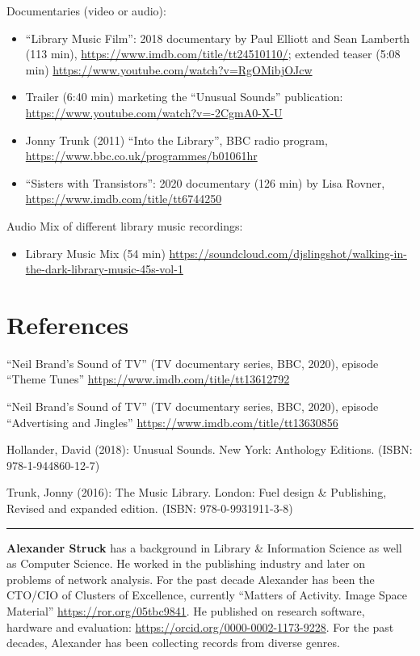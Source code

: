 \documentclass[a4paper,
fontsize=11pt,
oneside,
numbers=noperiodatend,
parskip=half-,
bibliography=totoc,
final
]{scrartcl}
\begin{document}
Documentaries (video or audio):

\begin{itemize}
\item
  \enquote{Library Music Film}: 2018 documentary by Paul Elliott and
  Sean Lamberth (113 min), \url{https://www.imdb.com/title/tt24510110/};
  extended teaser (5:08 min)
  \url{https://www.youtube.com/watch?v=RgOMibjOJcw}
\item
  Trailer (6:40 min) marketing the \enquote{Unusual Sounds} publication:
  \url{https://www.youtube.com/watch?v=-2CgmA0-X-U}
\item
  Jonny Trunk (2011) \enquote{Into the Library}, BBC radio program,
  \url{https://www.bbc.co.uk/programmes/b01061hr}
\item
  \enquote{Sisters with Transistors}: 2020 documentary (126 min) by Lisa
  Rovner, \url{https://www.imdb.com/title/tt6744250}
\end{itemize}

Audio Mix of different library music recordings:

\begin{itemize}
\item
  Library Music Mix (54 min)
  \url{https://soundcloud.com/djslingshot/walking-in-the-dark-library-music-45s-vol-1}
\end{itemize}

\hypertarget{references}{%
\section{References}\label{references}}

\enquote{Neil Brand's Sound of TV} (TV documentary series, BBC, 2020),
episode \enquote{Theme Tunes}
\url{https://www.imdb.com/title/tt13612792}

\enquote{Neil Brand's Sound of TV} (TV documentary series, BBC, 2020),
episode \enquote{Advertising and Jingles}
\url{https://www.imdb.com/title/tt13630856}

Hollander, David (2018): Unusual Sounds. New York: Anthology Editions.
(ISBN: 978-1-944860-12-7)

Trunk, Jonny (2016): The Music Library. London: Fuel design \&
Publishing, Revised and expanded edition. (ISBN: 978-0-9931911-3-8)

\begin{center}\rule{0.5\linewidth}{0.5pt}\end{center}

\textbf{Alexander Struck} has a background in Library \& Information
Science as well as Computer Science. He worked in the publishing
industry and later on problems of network analysis. For the past decade
Alexander has been the CTO/CIO of Clusters of Excellence, currently
``Matters of Activity. Image Space Material''
\url{https://ror.org/05tbc9841}. He published on research software,
hardware and evaluation: \url{https://orcid.org/0000-0002-1173-9228}.
For the past decades, Alexander has been collecting records from diverse
genres.
\end{document}
